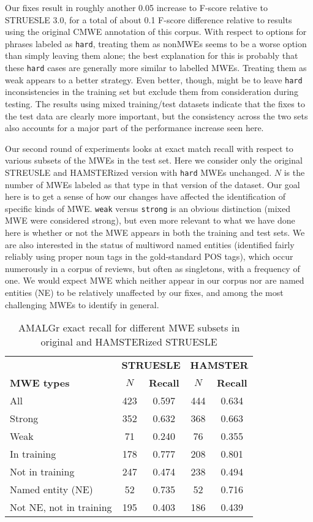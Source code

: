\documentclass[output=paper
,modfonts
,nonflat]{langsci/langscibook}
\newcommand{\mwetype}[1]{\texttt{#1}\xspace}
\newcommand{\strongish}{\mwetype{strong}}
\newcommand{\weak}{\mwetype{weak}}
\newcommand{\hard}{\mwetype{hard}}
\newcommand{\zp}{\phantom{0}}
\begin{document}
Our fixes result in roughly another 0.05 increase to F-score relative to STRUESLE 3.0, for a total of about 0.1 F-score difference relative to results using the original CMWE annotation of this corpus. With respect to options for phrases labeled as \hard, treating them as nonMWEs seems to be a worse option than simply leaving them alone; the best explanation for this is probably that these \hard cases are generally more similar to labelled MWEs. Treating them as weak appears to a better strategy. Even better, though, might be to leave \hard inconsistencies in the training set but exclude them from consideration during testing. The results using mixed training/test datasets indicate that the fixes to the test data are clearly more important, but the consistency across the two sets also accounts for a major part of the performance increase seen here.

Our second round of experiments looks at exact match recall with respect to various subsets of the MWEs in the test set. Here we consider only the original STREUSLE and HAMSTERized version with \hard MWEs unchanged. $N$ is the number of MWEs labeled as that type in that version of the dataset. Our goal here is to get a sense of how our changes have affected the identification of specific kinds of MWE. \weak versus \strongish is an obvious distinction (mixed MWE were considered strong), but even more relevant to what we have done here is whether or not the MWE appears in both the training and test sets. We are also interested in the status of multiword named entities (identified fairly reliably using proper noun tags in the gold-standard POS tags), which occur numerously in a corpus of reviews, but often as singletons, \ie with a frequency of one. We would expect MWE which neither appear in our corpus nor are named entities (NE) to be relatively unaffected by our fixes, and among the most challenging MWEs to identify in general.


\begin{table*}[t!]
\caption{AMALGr exact recall for different MWE subsets in original and HAMSTERized STRUESLE} %
\begin{tabular}{l c c c c}
\toprule
&\multicolumn{2}{c}{\textbf{STRUESLE}} & \multicolumn{2}{c}{\textbf{HAMSTER}} \\
\textbf{MWE types}& \textbf{$N$}& \textbf{Recall}& \textbf{$N$} & \textbf{Recall} \\
\midrule
All & 423 & 0.597 & 444 & 0.634\\
\midrule
Strong &  352 & 0.632 & 368 & 0.663\\
Weak & \zp71& 0.240 & \zp76 & 0.355 \\
\midrule
In training & 178 & 0.777 & 208 & 0.801 \\ 
Not in training & 247 & 0.474 & 238 & 0.494 \\
\midrule
Named entity (NE)& \zp52 & 0.735 & \zp52 & 0.716 \\
Not NE, not in training & 195& 0.403 & 186& 0.439\\
\bottomrule
\end{tabular}%
\label{tab:exp2} %
\end{table*}
\end{document}
